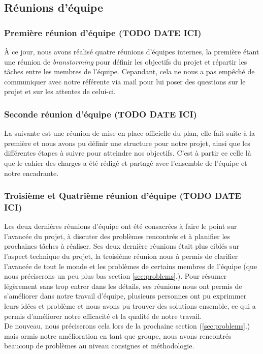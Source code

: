 \documentclass[12pt,a4paper]{article}
\begin{document}
\subsection{Réunions d'équipe}

\subsubsection{Première réunion d'équipe (\textbf{TODO DATE ICI})}
À ce jour, nous avons réalisé quatre réunions d'équipes internes, la première étant une réunion de \textit{branstorming} 
pour définir les objectifs du projet et répartir les tâches entre les membres de l'équipe. 
Cepandant, cela ne nous a pas empêché de communiquer avec notre référente via mail pour lui poser des questions sur le projet et sur les attentes de celui-ci.

\subsubsection{Seconde réunion d'équipe (\textbf{TODO DATE ICI})}
La suivante est une réunion de mise en place officielle du plan, elle fait suite à la première et nous avons pu définir une structure pour notre projet,
ainsi que les différentes étapes à suivre pour atteindre nos objectifs. C'est à partir ce celle là que le cahier des charges
a été rédigé et partagé avec l'ensemble de l'équipe et notre encadrante.

\subsubsection{Troisième et Quatrième réunion d'équipe (\textbf{TODO DATE ICI})}
Les deux dernières réunions d'équipe ont été consacrées à faire le point sur l'avancée du projet, 
à discuter des problèmes rencontrés et à planifier les prochaines tâches à réaliser.
Ses deux dernière réunions était plus ciblés sur l'aspect technique du projet, la troisième réunion nous à permis de clarifier
l'avancée de tout le monde et les problèmes de certains membres de l'équipe (que nous préciserons un peu plus bas section \ref{sec:problems}.).\smallbreak
Pour résumer légèrement sans trop entrer dans les détails, ses réunions nous ont permis de s'améliorer dans notre travail d'équipe,
plusieurs personnes ont pu exprimmer leurs idées et problème et nous avons pu trouver des solutions ensemble,
ce qui a permis d'améliorer notre efficacité et la qualité de notre travail.\\
De nouveau, nous préciserons cela lors de la prochaine section (\ref{sec:problems}.) 
mais ormis notre amélioration en tant que groupe, nous avons rencontrés beaucoup de problèmes au niveau consignes et méthodologie.
\end{document}
